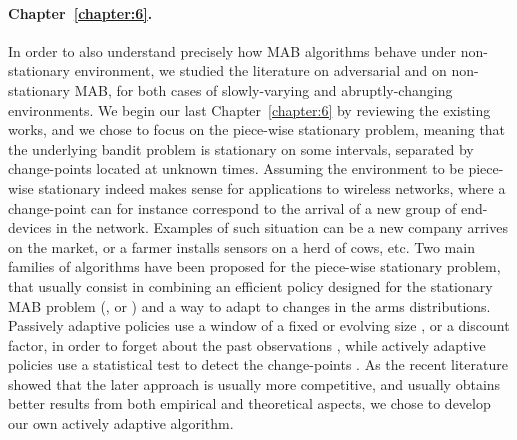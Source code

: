 \paragraph{Chapter~\ref{chapter:6}.}
%
In order to also understand precisely how MAB algorithms behave under non-stationary environment, we studied the literature on adversarial and on non-stationary MAB, for both cases of slowly-varying and abruptly-changing environments.
We begin our last Chapter~\ref{chapter:6} by reviewing the existing works,
and we chose to focus on the piece-wise stationary problem,
meaning that the underlying bandit problem is stationary on some intervals, separated by change-points located at unknown times.
Assuming the environment to be piece-wise stationary indeed makes sense for applications to wireless networks, where a change-point can for instance correspond to the arrival of a new group of end-devices in the network. Examples of such situation can be a new company arrives on the market, or a farmer installs sensors on a herd of cows, etc.
%
Two main families of algorithms have been proposed for the piece-wise stationary problem,
that usually consist in combining an efficient policy designed for the stationary MAB problem (\eg, \UCB{} or \klUCB) and a way to adapt to changes in the arms distributions.
Passively adaptive policies use a window of a fixed or evolving size \cite{Garivier11UCBDiscount}, or a discount factor, in order to forget about the past observations \cite{Kocsis06,Gupta11thompson},
while actively adaptive policies use a statistical test to detect the change-points \cite{MellorShapiro13,Allesiardo15}.
%
As the recent literature showed that the later approach is usually more competitive, and usually obtains better results from both empirical and theoretical aspects, we chose to develop our own actively adaptive algorithm.

